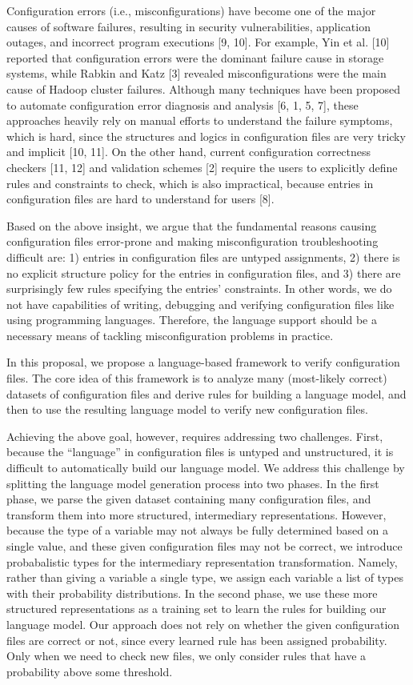 Configuration errors (i.e., misconfigurations) have become one of the major causes of software failures, resulting in security vulnerabilities, application outages, and incorrect program executions [9, 10]. 
For example, Yin et al. [10] reported that configuration errors were the dominant failure cause in storage systems, while Rabkin and Katz [3] revealed misconfigurations were the main cause of Hadoop cluster failures. 
Although many techniques have been proposed to automate configuration error diagnosis and analysis [6, 1, 5, 7], these approaches heavily rely on manual efforts to understand the failure symptoms, which is hard, since the structures and logics in configuration files are very tricky and implicit [10, 11]. 
On the other hand, current configuration correctness checkers [11, 12] and validation schemes [2] require the users to explicitly define rules and constraints to check, which is also impractical, because entries in configuration files are hard to understand for users [8].

Based on the above insight, we argue that the fundamental reasons causing configuration files error-prone and making misconfiguration troubleshooting difficult are: 1) entries in configuration files are untyped assignments, 2) there is no explicit structure policy for the entries in configuration files, and 3) there are surprisingly few rules specifying the entries’ constraints. 
In other words, we do not have capabilities of writing, debugging and verifying configuration files like using programming languages. 
Therefore, the language support should be a necessary means of tackling misconfiguration problems in practice.

In this proposal, we propose a language-based framework to verify configuration files. 
The core idea of this framework is to analyze many (most-likely correct) datasets of configuration files and derive rules for building a language model, and then to use the resulting language model to verify new configuration files.

Achieving the above goal, however, requires addressing two challenges. 
First, because the “language” in configuration files is untyped and unstructured, it is difficult to automatically build our language model. 
We address this challenge by splitting the language model generation process into two phases. 
In the first phase, we parse the given dataset containing many configuration files, and transform them into more structured, intermediary representations. 
However, because the type of a variable may not always be fully determined based on a single value, and these given configuration files may not be correct, we introduce probabalistic types for the intermediary representation transformation. 
Namely, rather than giving a variable a single type, we assign each variable a list of types with their probability distributions. 
In the second phase, we use these more structured representations as a training set to learn the rules for building our language model. 
Our approach does not rely on whether the given configuration files are correct or not, since every learned rule has been assigned probability. 
Only when we need to check new files, we only consider rules that have a probability above some threshold.

